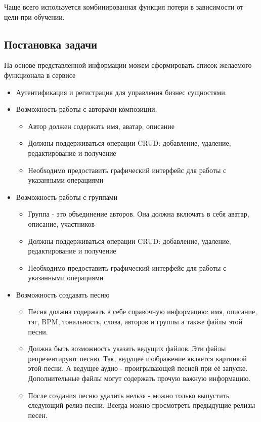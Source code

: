\documentclass[14pt]{extarticle}
\begin{document}
Чаще всего используется комбинированная функция потери в зависимости от цели при обучении.

\subsection{Постановка задачи}

На основе представленной информации можем сформировать список желаемого функционала в сервисе

\begin{itemize}
	\item Аутентификация и регистрация для управления бизнес сущностями.
	\item Возможность работы с авторами композиции.
	\begin{itemize}
		\item Автор должен содержать имя, аватар, описание
		\item Должны поддерживаться операции CRUD: добавление, удаление, редактирование и получение 
		\item Необходимо предоставить графический интерфейс для работы с указанными операциями
	\end{itemize}
	\item Возможность работы с группами
	\begin{itemize}
		\item Группа - это объединение авторов. Она должна включать в себя аватар, описание, участников
		\item Должны поддерживаться операции CRUD: добавление, удаление, редактирование и получение 
		\item Необходимо предоставить графический интерфейс для работы с указанными операциями
	\end{itemize}
	\item Возможность создавать песню
	\begin{itemize}
		\item Песня должна содержать в себе справочную информацию: имя, описание, тэг, BPM, тональность, слова, авторов и группы а также файлы этой песни.
		\item Должна быть возможность указать ведущих файлов. Эти файлы репрезентируют песню. Так, ведущее изображение является картинкой этой песни. А ведущее аудио - проигрывающей песней при её запуске. Дополнительные файлы могут содержать прочую важную информацию.
		\item После создания песню удалить нельзя - можно только выпустить следующий релиз песни. Всегда можно просмотреть предыдущие релизы песен.

\end{itemize}
\end{itemize}
\end{document}
